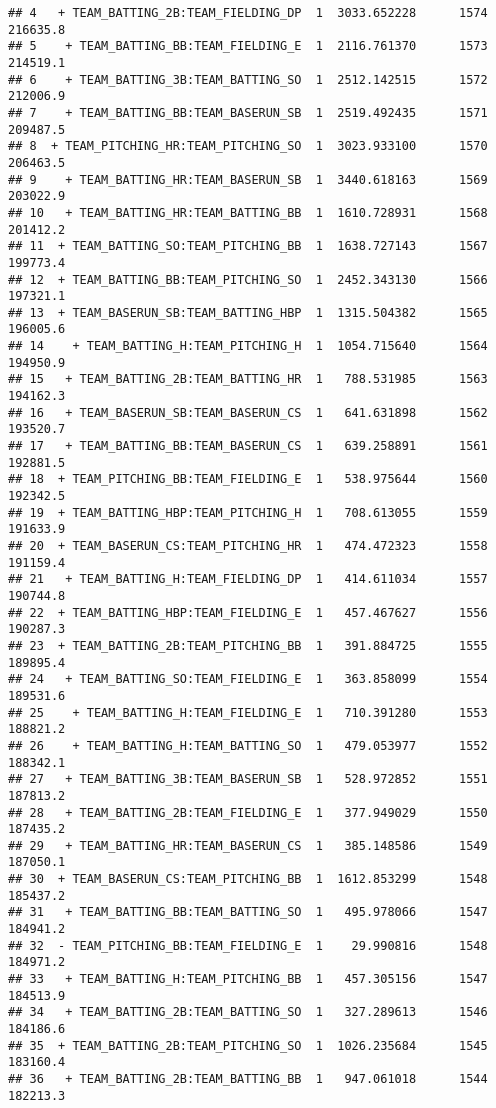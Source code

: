 \documentclass[
]{article}
\begin{document}
\begin{verbatim}
## 4   + TEAM_BATTING_2B:TEAM_FIELDING_DP  1  3033.652228      1574   216635.8
## 5    + TEAM_BATTING_BB:TEAM_FIELDING_E  1  2116.761370      1573   214519.1
## 6    + TEAM_BATTING_3B:TEAM_BATTING_SO  1  2512.142515      1572   212006.9
## 7    + TEAM_BATTING_BB:TEAM_BASERUN_SB  1  2519.492435      1571   209487.5
## 8  + TEAM_PITCHING_HR:TEAM_PITCHING_SO  1  3023.933100      1570   206463.5
## 9    + TEAM_BATTING_HR:TEAM_BASERUN_SB  1  3440.618163      1569   203022.9
## 10   + TEAM_BATTING_HR:TEAM_BATTING_BB  1  1610.728931      1568   201412.2
## 11  + TEAM_BATTING_SO:TEAM_PITCHING_BB  1  1638.727143      1567   199773.4
## 12  + TEAM_BATTING_BB:TEAM_PITCHING_SO  1  2452.343130      1566   197321.1
## 13  + TEAM_BASERUN_SB:TEAM_BATTING_HBP  1  1315.504382      1565   196005.6
## 14    + TEAM_BATTING_H:TEAM_PITCHING_H  1  1054.715640      1564   194950.9
## 15   + TEAM_BATTING_2B:TEAM_BATTING_HR  1   788.531985      1563   194162.3
## 16   + TEAM_BASERUN_SB:TEAM_BASERUN_CS  1   641.631898      1562   193520.7
## 17   + TEAM_BATTING_BB:TEAM_BASERUN_CS  1   639.258891      1561   192881.5
## 18  + TEAM_PITCHING_BB:TEAM_FIELDING_E  1   538.975644      1560   192342.5
## 19  + TEAM_BATTING_HBP:TEAM_PITCHING_H  1   708.613055      1559   191633.9
## 20  + TEAM_BASERUN_CS:TEAM_PITCHING_HR  1   474.472323      1558   191159.4
## 21   + TEAM_BATTING_H:TEAM_FIELDING_DP  1   414.611034      1557   190744.8
## 22  + TEAM_BATTING_HBP:TEAM_FIELDING_E  1   457.467627      1556   190287.3
## 23  + TEAM_BATTING_2B:TEAM_PITCHING_BB  1   391.884725      1555   189895.4
## 24   + TEAM_BATTING_SO:TEAM_FIELDING_E  1   363.858099      1554   189531.6
## 25    + TEAM_BATTING_H:TEAM_FIELDING_E  1   710.391280      1553   188821.2
## 26    + TEAM_BATTING_H:TEAM_BATTING_SO  1   479.053977      1552   188342.1
## 27   + TEAM_BATTING_3B:TEAM_BASERUN_SB  1   528.972852      1551   187813.2
## 28   + TEAM_BATTING_2B:TEAM_FIELDING_E  1   377.949029      1550   187435.2
## 29   + TEAM_BATTING_HR:TEAM_BASERUN_CS  1   385.148586      1549   187050.1
## 30  + TEAM_BASERUN_CS:TEAM_PITCHING_BB  1  1612.853299      1548   185437.2
## 31   + TEAM_BATTING_BB:TEAM_BATTING_SO  1   495.978066      1547   184941.2
## 32  - TEAM_PITCHING_BB:TEAM_FIELDING_E  1    29.990816      1548   184971.2
## 33   + TEAM_BATTING_H:TEAM_PITCHING_BB  1   457.305156      1547   184513.9
## 34   + TEAM_BATTING_2B:TEAM_BATTING_SO  1   327.289613      1546   184186.6
## 35  + TEAM_BATTING_2B:TEAM_PITCHING_SO  1  1026.235684      1545   183160.4
## 36   + TEAM_BATTING_2B:TEAM_BATTING_BB  1   947.061018      1544   182213.3

\end{verbatim}
\end{document}
